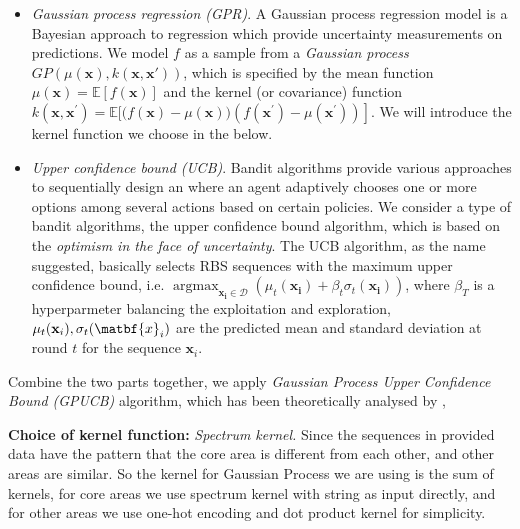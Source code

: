 \begin{itemize}
    \item \textit{Gaussian process regression (GPR)}.
    A Gaussian process regression model \cite{Rasmussen2004} is a Bayesian approach to regression which provide uncertainty measurements on predictions. 
    We model $f$ as a sample from a \textit{Gaussian process} $GP(\mu(\mathbf{x}), k(\mathbf{x}, \mathbf{x'}))$, which is specified by the mean function $\mu(\mathbf{x})=\mathbb{E}[f(\mathbf{x})]$ and the kernel (or covariance) function $k\left(\mathbf{x}, \mathbf{x}^{\prime}\right)=\mathbb{E}[(f(\mathbf{x})-\left.\mu(\mathbf{x}))\left(f\left(\mathbf{x}^{\prime}\right)-\mu\left(\mathbf{x}^{\prime}\right)\right)\right]$. We will introduce the kernel function we choose in the below. 
    
    
    \item \textit{Upper confidence bound (UCB)}. Bandit algorithms \cite{lattimore2018bandit} provide various approaches to sequentially design an where an agent adaptively chooses one or more options among several actions based on certain policies. We consider a type of bandit algorithms, the upper confidence bound algorithm, which is based on the \textit{optimism in the face of uncertainty}. The UCB algorithm, as the name suggested, basically selects RBS sequences with the maximum upper confidence bound, i.e. $\operatorname{argmax}_{\mathbf{x_i \in \mathcal{D}}} \left( \mu_t(\mathbf{x_i}) + \beta_t \sigma_t(\mathbf{x_i})\right)$, where $\beta_T$ is a hyperparmeter balancing the exploitation and exploration, $\mu_t(\mathbf{x}_i), \sigma_t(\matbf{x}_i)$ are the predicted mean and standard deviation at round $t$ for the sequence $\mathbf{x}_i$. 
\end{itemize}

Combine the two parts together, we apply \textit{Gaussian Process Upper Confidence Bound (GPUCB)} algorithm, which has been theoretically analysed by \textcite{srinivas2012information}, 

\textbf{Choice of kernel function:} \textit{Spectrum kernel.} Since the sequences in provided data have the pattern that the core area is different from each other, and other areas are similar. So the kernel for Gaussian Process we are using is the sum of kernels, for core areas we use spectrum kernel with string as input directly, and for other areas we use one-hot encoding and dot product kernel for simplicity.
